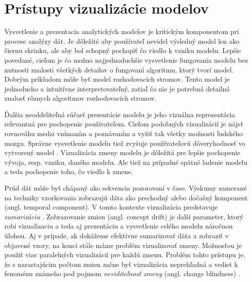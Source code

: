 \chapter{Prístupy vizualizácie modelov}
Vysvetlenie a prezentacia analytických modelov je kritickým komponentom pri procese analýzy dát. Je dôležité aby používateľ nevidel výsledný model len ako čiernu skrinku, ale aby bol schopný pochopiť čo viedlo k vzniku modelu. Lepšie povedané, cieľom je čo možno najjednoduchšie vysvetlenie fungovania modelu bez nutnosti znalosti všetkých detailov o fungovaní algoritmu, ktorý tvorí model. Dobrým príkladom môže byť model rozhodovacích stromov. Tento model je jednoducho a intuitívne interpretovateľný, zatiaľ čo nie je potrebná detailná znalosť rôznych algoritmov rozhodovacích stromov.
\par
Ďalšia neoddeliteľná súčasť prezentácie modelu je jeho vizuálna reprezentácia relevantná pre pochopenie používateľom. Cieľom podobných vizualizácií je nájsť rovnováhu medzi vnímaním a poznávaním a vyžiť tak všetky možnosti ľudského mozgu. Správne vysvetlenie modelu tiež zvyšuje používateľovú dôveryhodnosť vo vytvorený model \citep{Demsar2014, Barlow2001}. Vizualizácia zmeny modelu je dôležitá pre lepšie pochopenie vývoja, resp. vzniku, daného modelu. Ale tiež na prípadné spätné ladenie modelu a teda pochopenie toho, čo viedlo k zmene.
\par
Prúd dát môže byť chápaný ako sekvencia pozorovaní v čase. Výskumy zamerané na techniky vzorkovania zobrazujú dáta ako prechodný alebo dočašný komponent (angl. temporal component). V tomto kontexte vizualizácia predstavuje \textit{sumarizáciu} \citep{Demsar2014}. Zobrazovanie zmien (angl. concept drift) je další parameter, ktorý robí vizualízaciu a teda aj prezentáciu a vysvetlenie celého modelu náročnou úlohou. Aj v prípade, ak dokážeme efektívne sumarizovať dáta a zobraziť v objavené vzory, na konci stále máme problém vizualizovať zmeny. Možnosťou je použiť viac paralelných vizualizácií pre každú zmenu. Problém tohto prístupu je, že s narastajúcim počtom zmien začne byť vizualizácia neprehľadná a vediet k fenoménu známeho pod pojmom \textit{neviditeľnosť zmeny} (angl. change blindness) \citep{Demsar2014}.
\par
